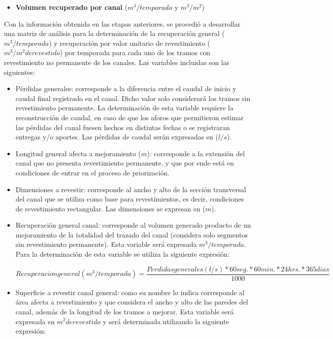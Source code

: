 \documentclass[]{article}
\begin{document}
\begin{itemize}
\item \textbf{Volumen recuperado por canal} ($m^3/temporada$ y $m^3/m^2$)
\end{itemize}

Con la información obtenida en las etapas anteriores, se procedió a desarrollar una matriz de análisis para la determinación de la recuperación general ($m^3/temporada$) y recuperación por valor unitario de revestimiento ($m^3/m^2 de revestido$) por temporada para cada uno de los tramos con revestimiento no permanente de los canales. Las variables incluidas son las siguientes:

\begin{itemize}
\item Pérdidas generales: corresponde a la diferencia entre el caudal de inicio y caudal final registrado en el canal. Dicho valor solo considerará los tramos sin revestimiento permanente. La determinación de esta variable requiere la reconstrucción de caudal, en caso de que los aforos que permitieron estimar las pérdidas del canal fuesen hechos en distintas fechas o se registraran entregas y/o aportes. Las pérdidas de caudal serán expresadas en ($l/s$).
\item Longitud general afecta a mejoramiento ($m$): corresponde a la extensión del canal que no presenta revestimiento permanente, y que por ende está en condiciones de entrar en el proceso de priorización.
\item Dimensiones a revestir: corresponde al ancho y alto de la sección transversal del canal que se utiliza como base para revestimientos, es decir, condiciones de revestimiento rectangular. Las dimensiones se expresan en ($m$).
\item Recuperación general canal: corresponde al volumen generado producto de un mejoramiento de la totalidad del trazado del canal (considera solo segmentos sin revestimiento permanente). Esta variable será expresada $m^3/temporada$. Para la determinación de esta variable se utiliza la siguiente expresión:

\begin{equation}
Recuperacion general(m^3/temporada)= \frac{Perdidas generales (l/s) * 60 seg. * 60 min. * 24 hrs. * 365 dias} {1000}  
\end{equation}

\item Superficie a revestir canal general: como su nombre lo indica corresponde al área afecta a revestimiento y que considera el ancho y alto de las paredes del canal, además de la longitud de los tramos a mejorar. Esta variable será expresada en $m^2derevestido$ y será determinada utilizando la siguiente expresión:


\end{itemize}
\end{document}
